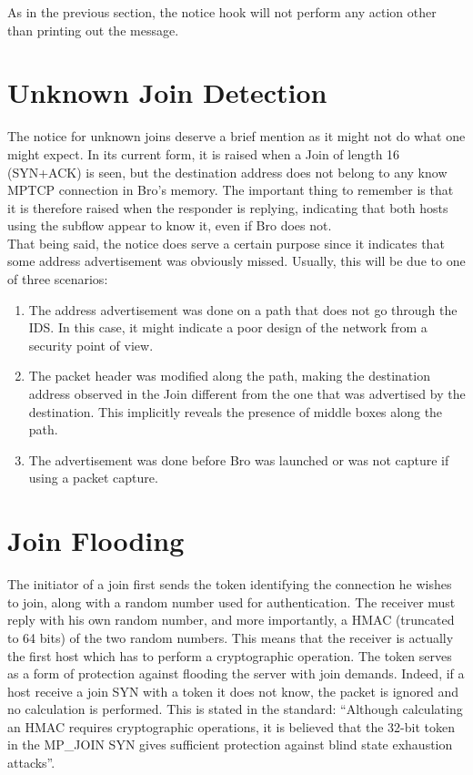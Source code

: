 As in the previous section, the notice hook will not perform any action other than printing out the message.

\section{Unknown Join Detection}
The notice for unknown joins deserve a brief mention as it might not do what one might expect. In its current form, it is raised when a Join of length 16 (SYN+ACK) is seen, but the destination address does not belong to any know MPTCP connection in Bro's memory. The important thing to remember is that it is therefore raised when the responder is replying, indicating that both hosts using the subflow appear to know it, even if Bro does not. \\

That being said, the notice does serve a certain purpose since it indicates that some address advertisement was obviously missed. Usually, this will be due to one of three scenarios: \\

\begin{enumerate}
\item The address advertisement was done on a path that does not go through the IDS. In this case, it might indicate a poor design of the network from a security point of view.
\item The packet header was modified along the path, making the destination address observed in the Join different from the one that was advertised by the destination. This implicitly reveals the presence of middle boxes along the path.
\item The advertisement was done before Bro was launched or was not capture if using a packet capture.
\end{enumerate}


\section{Join Flooding}
The initiator of a join first sends the token identifying the connection he wishes to join, along with a random number used for authentication. The receiver must reply with his own random number, and more importantly, a HMAC (truncated to 64 bits) of the two random numbers. This means that the receiver is actually the first host which has to perform a cryptographic operation. The token serves as a form of protection against flooding the server with join demands. Indeed, if a host receive a join SYN with a token it does not know, the packet is ignored and no calculation is performed. This is stated in the standard\cite{rfc6824}: ``Although calculating an HMAC requires cryptographic operations, it is believed that the 32-bit token in the MP\_JOIN SYN gives sufficient protection against blind state exhaustion attacks''.\\

